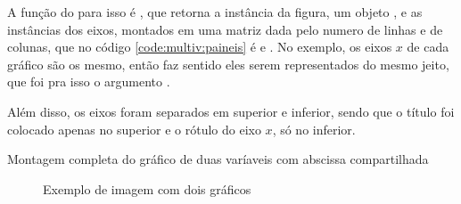     A função do \pyplot para isso é , que retorna a instância da figura, um objeto , e as instâncias dos eixos, montados em uma matriz dada pelo numero de linhas e de colunas, que no código \ref{code:multiv:paineis} é  e . No exemplo, os eixos $x$ de cada gráfico são os mesmo, então faz sentido eles serem representados do mesmo jeito, que foi pra isso o argumento .

    Além disso, os eixos foram separados em superior e inferior, sendo que o título foi colocado apenas no superior e o rótulo do eixo $x$, só no inferior.

    \begin{listing}[H]
        \caption{Montagem completa do gráfico de duas varíaveis com abscissa compartilhada}
        \label{code:multiv:paineis}

    \end{listing}

    \begin{figure}[H]
        \centering
        

        \caption{Exemplo de imagem com dois gráficos}
        \label{fig:multiv:paineis}
    \end{figure}
